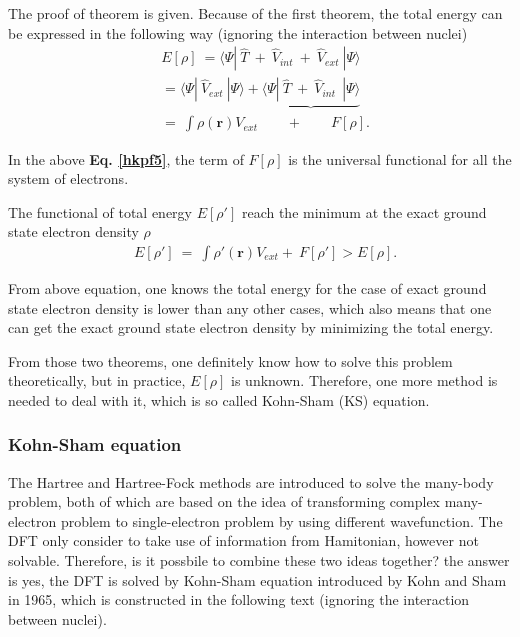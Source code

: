 \documentclass[a4paper, 12pt, titlepage,oneside,drop]{kthesis}
\begin{document}
The proof of theorem is given. Because of the first theorem, the total energy can be expressed in the following way (ignoring the interaction between nuclei)
\begin{equation}\label{hkpf5}\begin{split}
& E[\rho] \ = \langle \Psi  | \ \hat{T} \ + \ \hat{V}_\textit{int}  \ + \ \hat{V}_\textit{ext} \ | \Psi \rangle \\
&     = \langle \Psi  | \ \hat{V}_\textit{ext} \ | \Psi \rangle  + \underbrace{\langle \Psi  | \ \hat{T} \ + \ \hat{V}_\textit{int}  \ \ | \Psi \rangle}  \\
&     =   \ \int \rho(\textbf{r}) V_\textit{ext} \qquad +  \qquad F[\rho]. 
\end{split}
\end{equation}

In the above \textbf{Eq. \ref{hkpf5}}, the term of $F[\rho]$ is the universal functional for all the system of electrons.

The functional of total energy $E[\rho']$ reach the minimum at the exact ground state electron density $\rho$
\begin{equation}\begin{split}
 & E[\rho'] \ =   \ \int \rho'(\textbf{r}) V_\textit{ext}  + \  F[\rho'] > E[\rho]. 
\end{split}
\end{equation}
 


From above equation, one knows the total energy for the case of exact ground state electron density is lower than any other cases, which also means that one can get 
the exact ground state electron density by minimizing the total energy.



From those two theorems, one definitely know how to solve this problem theoretically, but in practice, $E[\rho]$ is unknown. 
Therefore, one more method is needed to deal with it, which is so called Kohn-Sham (KS) equation.

\subsubsection{Kohn-Sham equation}

The Hartree and Hartree-Fock methods are introduced to solve the many-body problem, both of which are based on the idea of transforming complex 
many-electron problem to single-electron problem by using different wavefunction. The DFT only consider to take use of information from Hamitonian, however not solvable. 
Therefore, is it possbile to combine these two ideas together? the answer is yes, the DFT is solved by Kohn-Sham equation introduced by Kohn and Sham in 1965,
which is constructed in the following text (ignoring the interaction between nuclei).
\end{document}
